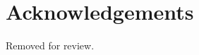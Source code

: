 \documentclass[10pt, a4paper]{article}
\begin{document}


\section*{Acknowledgements}

Removed for review.





\end{document}

